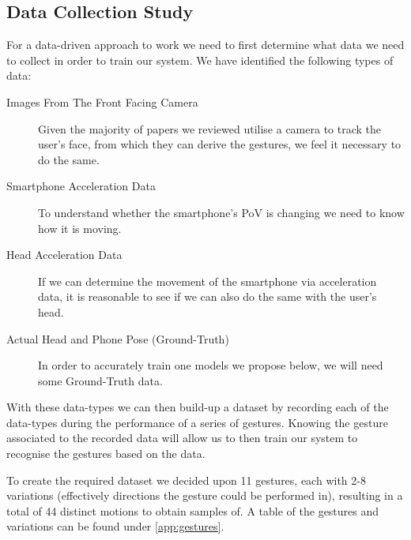 \subsection{Data Collection Study} %


For a data-driven approach to work we need to first determine what data we need to collect in order to train our system. We have identified the following types of data:
\begin{description}
    \item[Images From The Front Facing Camera] Given the majority of papers we reviewed  utilise a camera to track the user's face, from which they can derive the gestures, we feel it necessary to do the same.
    \item[Smartphone Acceleration Data] To understand whether the smartphone's PoV is changing we need to know how it is moving. 
    \item[Head Acceleration Data] If we can determine the movement of the smartphone via acceleration data, it is reasonable to see if we can also do the same with the user's head.
    \item[Actual Head and Phone Pose (Ground-Truth)] In order to accurately train one models we propose below, we will need some Ground-Truth data.
\end{description}

With these data-types we can then build-up a dataset by recording each of the data-types during the performance of a series of gestures. Knowing the gesture associated to the recorded data will allow us to then train our system to recognise the gestures based on the data.

To create the required dataset we decided upon 11 gestures, each with 2-8 variations (effectively directions the gesture could be performed in), resulting in a total of 44 distinct motions to obtain samples of. A table of the gestures and variations can be found under \autoref{app:gestures}.

